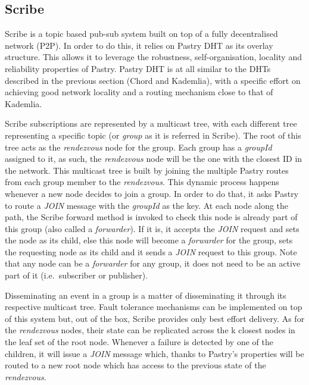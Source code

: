 \subsection{Scribe}\label{scribe}

Scribe \cite{Castro2002} is a topic based pub-sub system built
on top of a fully decentralised network (P2P). In order to do this, it
relies on Pastry DHT as its overlay structure. This allows it to
leverage the robustness, self-organisation, locality and reliability
properties of Pastry. Pastry DHT is at all similar to the DHTs described
in the previous section (Chord and Kademlia), with a specific effort on
achieving good network locality and a routing mechanism close to that of
Kademlia.

Scribe subscriptions are represented by a multicast tree, with each
different tree representing a specific topic (or \emph{group} as it is
referred in Scribe). The root of this tree acts as the \emph{rendezvous}
node for the group. Each group has a \emph{groupId} assigned to it, as
such, the \emph{rendezvous} node will be the one with the closest ID in
the network. This multicast tree is built by joining the multiple Pastry
routes from each group member to the \emph{rendezvous}. This dynamic
process happens whenever a new node decides to join a group. In order to
do that, it asks Pastry to route a \emph{JOIN} message with the
\emph{groupId} as the key. At each node along the path, the Scribe
forward method is invoked to check this node is already part of this
group (also called a \emph{forwarder}). If it is, it accepts the
\emph{JOIN} request and sets the node as its child, else this node will
become a \emph{forwarder} for the group, sets the requesting node as its
child and it sends a \emph{JOIN} request to this group. Note that any
node can be a \emph{forwarder} for any group, it does not need to be an active
part of it (i.e.~subscriber or publisher).

Disseminating an event in a group is a matter of disseminating it
through its respective multicast tree. Fault tolerance mechanisms can be
implemented on top of this system but, out of the box, Scribe provides
only best effort delivery. As for the \emph{rendezvous} nodes, their
state can be replicated across the k closest nodes in the leaf set of
the root node. Whenever a failure is detected by one of the children, it will
issue a \emph{JOIN} message which, thanks to Pastry's properties will be
routed to a new root node which has access to the previous state of the
\emph{rendezvous}.

